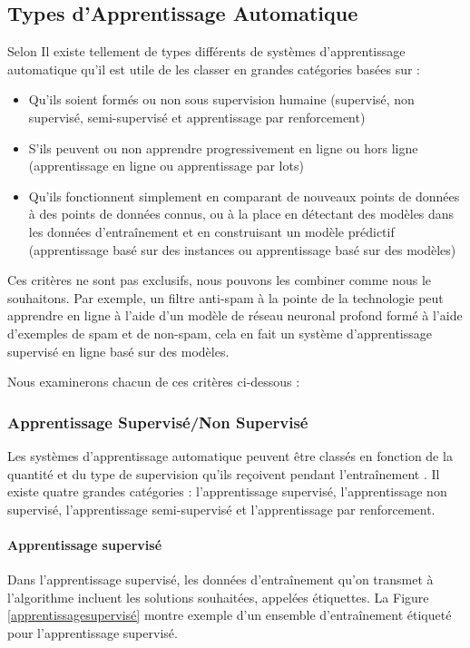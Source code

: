 \subsection{Types d'Apprentissage Automatique}
Selon \cite{book} Il existe tellement de types différents de systèmes d'apprentissage automatique qu'il est utile de les classer en grandes catégories basées sur :
\begin{itemize}
    \item Qu'ils soient formés ou non sous supervision humaine (supervisé, non supervisé, semi-supervisé et apprentissage par renforcement)
    \item S'ils peuvent ou non apprendre progressivement en ligne ou hors ligne (apprentissage en ligne ou apprentissage par lots)
    \item Qu'ils fonctionnent simplement en comparant de nouveaux points de données à des points de données connus, ou à la place en détectant des modèles dans les données d'entraînement et en construisant un modèle prédictif (apprentissage basé sur des instances ou apprentissage basé sur des modèles)
    
\end{itemize}

Ces critères ne sont pas exclusifs, nous pouvons les combiner comme nous le souhaitons. Par exemple, un filtre anti-spam à la pointe de la technologie peut apprendre en ligne à l'aide d'un modèle de réseau neuronal profond formé à l'aide d'exemples de spam et de non-spam, cela en fait un système d'apprentissage supervisé en ligne basé sur des modèles.

Nous examinerons chacun de ces critères ci-dessous :
\subsubsection{Apprentissage Supervisé/Non Supervisé }
Les systèmes d'apprentissage automatique peuvent être classés en fonction de la quantité et du type de supervision qu'ils reçoivent pendant l'entraînement \cite{book}. Il existe quatre grandes catégories : l'apprentissage supervisé, l'apprentissage non supervisé, l'apprentissage semi-supervisé et l'apprentissage par renforcement.

\paragraph{Apprentissage supervisé}

Dans l'apprentissage supervisé, les données d'entraînement qu’on transmet à l'algorithme incluent les solutions souhaitées, appelées étiquettes. La Figure \ref{apprentissagesupervisé} montre exemple d’un ensemble d'entraînement étiqueté pour l’apprentissage supervisé.

